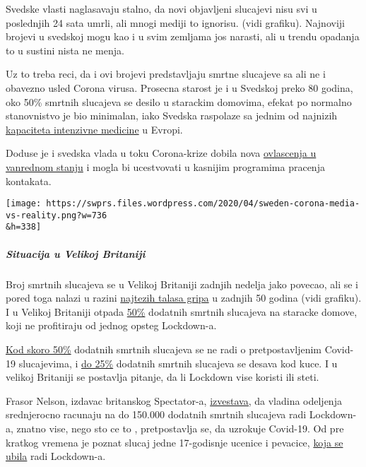 Svedske vlasti naglasavaju stalno, da novi objavljeni slucajevi nisu svi
u poslednjih 24 sata umrli, ali mnogi mediji to ignorisu. (vidi
grafiku). Najnoviji brojevi u svedskoj mogu kao i u svim zemljama jos
narasti, ali u trendu opadanja to u sustini nista ne menja.

Uz to treba reci, da i ovi brojevi predstavljaju smrtne slucajeve sa ali
ne i obavezno usled Corona virusa. Prosecna starost je i u Svedskoj
preko 80 godina, oko 50\% smrtnih slucajeva se desilo u starackim
domovima, efekat po normalno stanovnistvo je bio minimalan, iako Svedska
raspolaze sa jednim od najnizih
\href{https://link.springer.com/article/10.1007/s00134-012-2627-8}{kapaciteta
intenzivne medicine} u Evropi.

Doduse je i svedska vlada u toku Corona-krize dobila nova
\href{https://www.tagesschau.de/faktenfinder/ausland/corona-kursaenderung-schweden-103.html}{ovlascenja
u vanrednom stanju} i mogla bi ucestvovati u kasnijim programima
pracenja kontakata.

\texttt{[image: https://swprs.files.wordpress.com/2020/04/sweden-corona-media-vs-reality.png?w=736\\\&h=338]}

\hypertarget{situacija-u-velikoj-britaniji}{%
\subparagraph{\texorpdfstring{\textbf{Situacija u Velikoj
Britaniji}}{Situacija u Velikoj Britaniji}}\label{situacija-u-velikoj-britaniji}}

Broj smrtnih slucajeva se u Velikoj Britaniji zadnjih nedelja jako
povecao, ali se i pored toga nalazi u razini
\href{http://inproportion2.talkigy.com/}{najtezih talasa gripa} u
zadnjih 50 godina (vidi grafiku). I u Velikoj Britaniji otpada
\href{https://ltccovid.org/2020/04/12/mortality-associated-with-covid-19-outbreaks-in-care-homes-early-international-evidence/}{50\%}
dodatnih smrtnih slucajeva na staracke domove, koji ne profitiraju od
jednog opsteg Lockdown-a.

\href{https://ltccovid.org/2020/04/12/mortality-associated-with-covid-19-outbreaks-in-care-homes-early-international-evidence/}{Kod
skoro 50\%} dodatnih smrtnih slucajeva se ne radi o pretpostavljenim
Covid-19 slucajevima, i
\href{https://www.ft.com/content/67e6a4ee-3d05-43bc-ba03-e239799fa6ab}{do
25\%} dodatnih smrtnih slucajeva se desava kod kuce. I u velikoj
Britaniji se postavlja pitanje, da li Lockdown vise koristi ili steti.

Frasor Nelson, izdavac britanskog Spectator-a,
\href{https://www.telegraph.co.uk/politics/2020/04/09/boris-worried-lockdown-has-gone-far-can-end/}{izvestava,}
da vladina odeljenja srednjerocno racunaju na do 150.000 dodatnih
smrtnih slucajeva radi Lockdown-a, znatno vise, nego sto ce to ,
pretpostavlja se, da uzrokuje Covid-19. Od pre kratkog vremena je poznat
slucaj jedne 17-godisnje ucenice i pevacice,
\href{https://sports.yahoo.com/coronavirus-bethany-palmer-teenager-death-suicide-152707750.html}{koja
se ubila} radi Lockdown-a.


